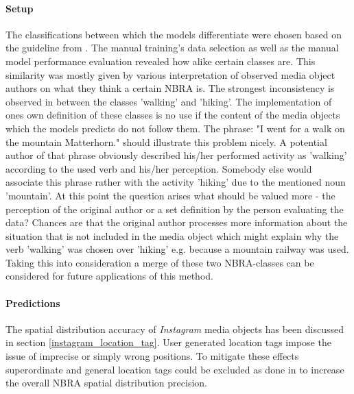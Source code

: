 \paragraph*{Setup} 
The classifications between which the models differentiate were chosen based on the guideline from \parencite{IFL2018}. The manual training's data selection as well as the manual model performance evaluation revealed how alike certain classes are. This similarity was mostly given by various interpretation of observed media object authors on what they think a certain NBRA is. The strongest inconsistency is observed in between the classes 'walking' and 'hiking'. The implementation of ones own definition of these classes is no use if the content of the media objects which the models predicts do not follow them. The phrase: "I went for a walk on the mountain Matterhorn." should illustrate this problem nicely. A potential author of that phrase obviously described his/her performed activity as 'walking' according to the used verb and his/her perception. Somebody else would associate this phrase rather with the activity 'hiking' due to the mentioned noun 'mountain'. At this point the question arises what should be valued more - the perception of the original author or a set definition by the person evaluating the data? Chances are that the original author processes more information about the situation that is not included in the media object which might explain why the verb 'walking' was chosen over 'hiking' e.g. because a mountain railway was used. 
Taking this into consideration a merge of these two NBRA-classes can be considered for future applications of this method.

\paragraph*{Predictions}
The spatial distribution accuracy of \textit{Instagram} media objects has been discussed in section \ref{instagram_location_tag}. User generated location tags impose the issue of imprecise or simply wrong positions. To mitigate these effects superordinate and general location tags could be excluded as done in \parencite{Heikinheimo2017} to increase the overall NBRA spatial distribution precision.
